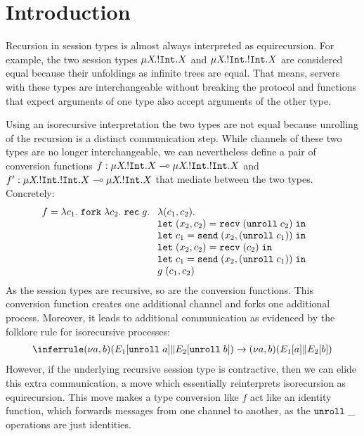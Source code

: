 
\section{Introduction}
\label{sec:introduction}

Recursion in session types is almost always interpreted as
equirecursion. For example, the two session types $\mu X\!.{{}!\mathtt{Int}.X} $
and $\mu X\!.{{}!\mathtt{Int}.{}!\mathtt{Int}.X} $ are considered equal because
their unfoldings as infinite trees are equal. That means, servers with
these types are interchangeable without breaking the protocol and
functions that expect arguments of one type also accept arguments of
the other type.

Using an isorecursive interpretation the two types are not equal
because unrolling of the recursion is a distinct communication
step. While channels of these two types are no longer
interchangeable, we can nevertheless define a pair of conversion
functions
$f : \mu X\!.{{}!\mathtt{Int}.X} \multimap \mu X\!.{{}!\mathtt{Int}.{}!\mathtt{Int}.X}$
and
$f' : \mu X\!.{{}!\mathtt{Int}.{}!\mathtt{Int}.X} \multimap \mu X\!.{{}!\mathtt{Int}.X}$
that mediate between the two types. Concretely:
\begin{align*}
  f &=       \ELam {c_1} \EFork{ \ELam {c_2} \ERec g %
      \begin{array}[t]{l}
      \ELam{(c_1, c_2)} \\
      \ELet{(x_2,c_2)}{\ERecv{(\EUnroll{c_2})}} \\
      \ELet{c_1}{\ESend{x_2}{(\EUnroll{c_1})}} \\
      \ELet{(x_2,c_2)}{\ERecv{({c_2})}} \\
      \ELet{c_1}{\ESend{x_2}{(\EUnroll{c_1})}} \\
        g \; ({c_1}, {c_2}) %
      \end{array}}
\end{align*}
As the session types are recursive, so are the conversion
functions. This conversion function creates one additional
channel and forks one additional process. Moreover, it leads to
additional communication as evidenced by the folklore rule for
isorecursive processes:
\begin{gather*}
  \reducerule{
    \PScope (\PPar* {\EUnroll a} {\EUnroll b})
  }{
    \PScope (\PPar* a b)
  }
\end{gather*}
However, if the underlying recursive session type is contractive, then we can
elide this extra communication, a move which essentially reinterprets
isorecursion as equirecursion.
This move makes a type conversion like $f$ act like an identity
function, which forwards messages from one channel to another, as the
$\mathtt{unroll}\; \_$ operations are just identities. 


